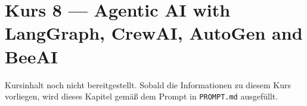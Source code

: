 \chapter{Kurs 8 --- Agentic AI with LangGraph, CrewAI, AutoGen and BeeAI}

\begin{luecke}
Kursinhalt noch nicht bereitgestellt. Sobald die Informationen zu diesem Kurs vorliegen,
wird dieses Kapitel gem\"a\ss{} dem Prompt in \texttt{PROMPT.md} ausgef\"ullt.
\end{luecke}

